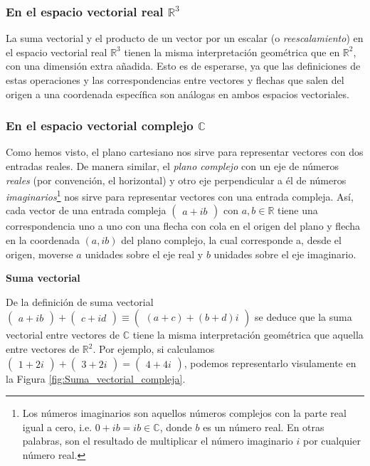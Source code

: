 \documentclass[apuntes]{subfiles}
\begin{document}
\subsubsection{En el espacio vectorial real \texorpdfstring{$\mathbb{R}^3$}{TEXT}}

La suma vectorial y el producto de un vector por un escalar (o \emph{reescalamiento}) en el espacio vectorial real $\mathbb{R}^3$ tienen la misma interpretación geométrica que en $\mathbb{R}^2$, con una dimensión extra añadida. Esto es de esperarse, ya que las definiciones de estas operaciones y las correspondencias entre vectores y flechas que salen del origen a una coordenada específica son análogas en ambos espacios vectoriales.

\subsubsection{En el espacio vectorial complejo \texorpdfstring{$\mathbb{C}$}{TEXT}}

Como hemos visto, el plano cartesiano nos sirve para representar vectores con dos entradas reales. De manera similar, el \emph{plano complejo} \textemdash con un eje de números \emph{reales} (por convención, el horizontal) y otro eje perpendicular a él de números \emph{imaginarios}\footnote{Los números imaginarios son aquellos números complejos con la parte real igual a cero, i.e. $0+ib=ib\in\mathbb{C}$, donde $b$ es un número real. En otras palabras, son el resultado de multiplicar el número imaginario $i$ por cualquier número real.}\textemdash\hspace{0.5mm} nos sirve para representar vectores con una entrada compleja. Así, cada vector de una entrada compleja $\begin{pmatrix}a+ib\end{pmatrix}$ con $a,b\in\mathbb{R}$ tiene una correspondencia uno a uno con una flecha con cola en el origen del plano y flecha en la coordenada $(a,ib)$ del plano complejo, la cual corresponde a, desde el origen, moverse $a$ unidades sobre el eje real y $b$ unidades sobre el eje imaginario.

\vspace{3mm}
\textbf{Suma vectorial}
\vspace{3mm}

De la definición de suma vectorial $\begin{pmatrix}a+ib\end{pmatrix}+\begin{pmatrix}c+id\end{pmatrix}\equiv\begin{pmatrix}(a+c)+(b+d)i\end{pmatrix}$ se deduce que la suma vectorial entre vectores de $\mathbb{C}$ tiene la misma interpretación geométrica que aquella entre vectores de $\mathbb{R}^2$. Por ejemplo, si calculamos $\begin{pmatrix}1+2i\end{pmatrix}+\begin{pmatrix}3+2i\end{pmatrix}=\begin{pmatrix}4+4i\end{pmatrix}$, podemos representarlo visulamente en la Figura \ref{fig:Suma_vectorial_compleja}.
\end{document}
